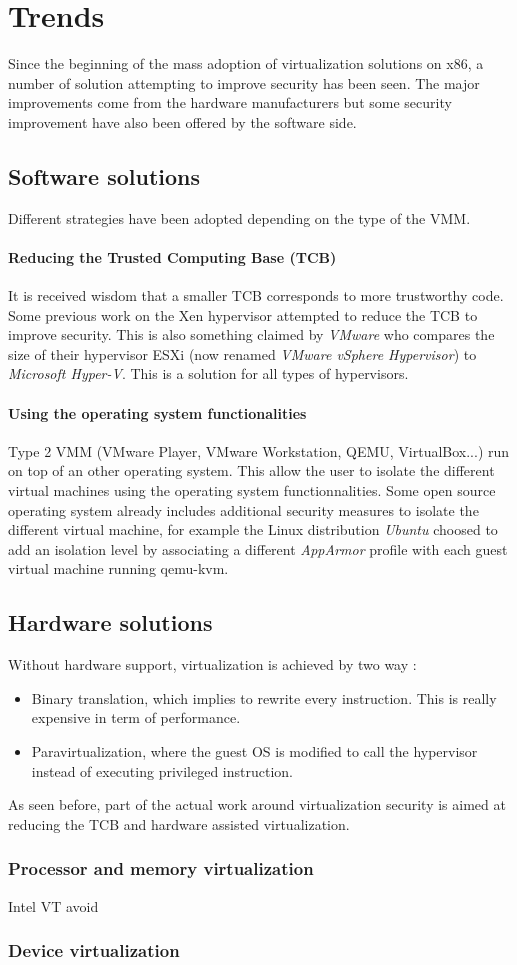 \section{Trends}
Since the beginning of the mass adoption of virtualization solutions on x86, a
number of solution attempting to improve security has been seen.
The major improvements come from the hardware manufacturers but some 
security improvement have also been offered by the software side.

\subsection{Software solutions}
Different strategies have been adopted depending on the type of the VMM.

\paragraph{Reducing the Trusted Computing Base (TCB)}
It is received wisdom that a smaller TCB corresponds to more trustworthy code.
Some previous work on the Xen\cite{xen} hypervisor attempted to reduce the
TCB\cite{xen-disaggregation} to
improve security.
This is also something claimed by \emph{VMware}\cite{vmware-footprint} who
compares the size of their hypervisor ESXi (now renamed \emph{VMware vSphere
Hypervisor}) to \emph{Microsoft Hyper-V}.
This is a solution for all types of hypervisors.

\paragraph{Using the operating system functionalities}
Type 2 VMM (VMware Player, VMware Workstation, QEMU, VirtualBox...) run on top
of an other operating system.
This allow the user to isolate the different virtual machines using the
operating system functionnalities.
Some open source operating system already includes additional security measures
to isolate the different virtual machine, for example the Linux distribution
\emph{Ubuntu}\cite{ubuntu} choosed to add an isolation level by associating a different
\emph{AppArmor}\cite{apparmor} profile with each guest virtual machine running
qemu-kvm.

\subsection{Hardware solutions}
Without hardware support, virtualization is achieved by two way :
\begin{itemize}
\item Binary translation, which implies to rewrite every instruction. This is
really expensive in term of performance.
\item Paravirtualization, where the guest OS is modified to call the hypervisor
instead of executing privileged instruction.
\end{itemize}

As seen before, part of the actual work around virtualization security is aimed at
reducing the TCB and hardware assisted virtualization.

\subsubsection{Processor and memory virtualization}
Intel VT avoid

\subsubsection{Device virtualization}

